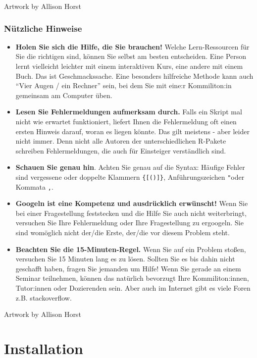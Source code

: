 \documentclass[
]{book}
\begin{document}
Artwork by Allison Horst

\hypertarget{nuxfctzliche-hinweise}{%
\subsection{Nützliche Hinweise}\label{nuxfctzliche-hinweise}}

\begin{itemize}
\item
  \textbf{Holen Sie sich die Hilfe, die Sie brauchen!}
  Welche Lern-Ressourcen für Sie die richtigen sind, können Sie selbst am besten entscheiden. Eine Person lernt vielleicht leichter mit einem interaktiven Kurs, eine andere mit einem Buch. Das ist Geschmackssache. Eine besonders hilfreiche Methode kann auch ``Vier Augen / ein Rechner'' sein, bei dem Sie mit eine:r Kommiliton:in gemeinsam am Computer üben.
\item
  \textbf{Lesen Sie Fehlermeldungen aufmerksam durch.}
  Falls ein Skript mal nicht wie erwartet funktioniert, liefert Ihnen die Fehlermeldung oft einen ersten Hinweis darauf, woran es liegen könnte. Das gilt meistens - aber leider nicht immer. Denn nicht alle Autoren der unterschiedlichen R-Pakete schreiben Fehlermeldungen, die auch für Einsteiger verständlich sind.
\item
  \textbf{Schauen Sie genau hin}.
  Achten Sie genau auf die Syntax: Häufige Fehler sind vergessene oder doppelte Klammern \texttt{\{{[}(){]}\}}, Anführungszeichen \texttt{"}oder Kommata \texttt{,}.
\item
  \textbf{Googeln ist eine Kompetenz und ausdrücklich erwünscht!}
  Wenn Sie bei einer Fragestellung feststecken und die Hilfe Sie auch nicht weiterbringt, versuchen Sie Ihre Fehlermeldung oder Ihre Fragestellung zu ergoogeln. Sie sind womöglich nicht der/die Erste, der/die vor diesem Problem steht.
\item
  \textbf{Beachten Sie die 15-Minuten-Regel.}
  Wenn Sie auf ein Problem stoßen, versuchen Sie 15 Minuten lang es zu lösen. Sollten Sie es bis dahin nicht geschafft haben, fragen Sie jemanden um Hilfe! Wenn Sie gerade an einem Seminar teilnehmen, können das natürlich bevorzugt Ihre Kommiliton:innen, Tutor:innen oder Dozierenden sein. Aber auch im Internet gibt es viele Foren z.B. stackoverflow.
\end{itemize}

Artwork by Allison Horst

\hypertarget{installation}{%
\chapter{Installation}\label{installation}}
\end{document}
